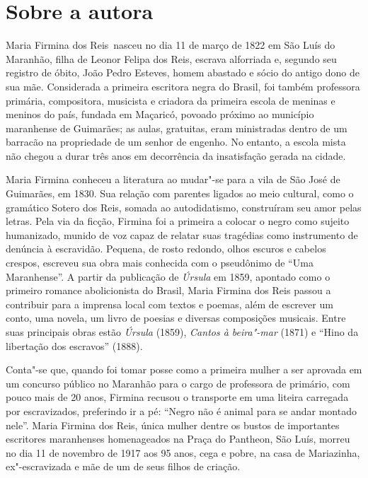 \chapter{Sobre a autora}

Maria Firmina dos Reis~nasceu no dia 11 de março de 1822 em São Luís do
Maranhão, filha de Leonor Felipa dos Reis, escrava alforriada e, segundo
seu registro de óbito, João Pedro Esteves, homem abastado e sócio do
antigo dono de sua mãe. Considerada a primeira escritora negra do
Brasil, foi também professora primária, compositora, musicista e
criadora da primeira escola de meninas e meninos do país, fundada em
Maçaricó, povoado próximo ao município maranhense de Guimarães; as
aulas, gratuitas, eram ministradas dentro de um barracão na propriedade
de um senhor de engenho. No entanto, a escola mista não chegou a durar
três anos em decorrência da insatisfação gerada na cidade.

Maria Firmina conheceu a literatura ao mudar"-se para a vila de São José
de Guimarães, em 1830. Sua relação com parentes ligados ao meio
cultural, como o gramático Sotero dos Reis, somada ao autodidatismo,
construíram seu amor pelas letras. Pela via da ficção, Firmina foi a
primeira a colocar o negro como sujeito humanizado, munido de voz capaz
de relatar suas tragédias como instrumento de denúncia à escravidão.
Pequena, de rosto redondo, olhos escuros e cabelos crespos, escreveu sua
obra mais conhecida com o pseudônimo de ``Uma Maranhense''. A partir da
publicação de \emph{Úrsula} em 1859, apontado como o primeiro romance
abolicionista do Brasil, Maria Firmina dos Reis passou a contribuir para
a imprensa local com textos e poemas, além de escrever um conto, uma
novela, um livro de poesias e diversas composições musicais. Entre suas
principais obras estão \emph{Úrsula} (1859), \emph{Cantos à beira"-mar}
(1871) e ``Hino da libertação dos escravos'' (1888).

Conta"-se que, quando foi tomar posse como a primeira mulher a ser
aprovada em um concurso público no Maranhão para o cargo de professora
de primário, com pouco mais de 20 anos, Firmina recusou o transporte em
uma liteira carregada por escravizados, preferindo ir a pé: ``Negro não
é animal para se andar montado nele''. Maria Firmina dos Reis, única
mulher dentre os bustos de importantes escritores maranhenses
homenageados na Praça do Pantheon, São Luís, morreu no dia 11 de
novembro de 1917 aos 95 anos, cega e pobre, na casa de Mariazinha,
ex"-escravizada e mãe de um de seus filhos de criação.

